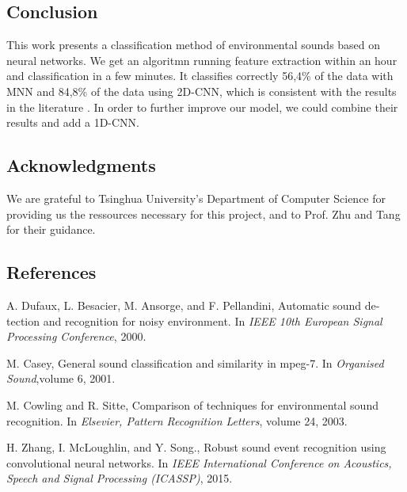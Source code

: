 \documentclass[final]{beamer}
\begin{document}
\begin{frame}[t]
\begin{multicols}{3}
\section{Conclusion}

	This work presents a classification method of environmental sounds based on neural networks. We get an algoritmn running feature extraction within an hour and classification in a few minutes. It classifies correctly 56,4\% of the data with MNN and 84,8\% of the data using 2D-CNN, which is consistent with the results in the literature \cite{ref4} \cite{ref5} \cite{ref6}.
	In order to further improve our model, we could combine their results and add a 1D-CNN.


\subsection{Acknowledgments}
	We are grateful to Tsinghua University's Department of Computer Science for providing us the ressources necessary for this project,
	and to Prof. Zhu and Tang for their guidance.


\subsection{References}

\begin{thebibliography}{99}

 A. Dufaux, L. Besacier, M. Ansorge, and F. Pellandini, Automatic sound de-
tection and recognition for noisy environment. In \textit{IEEE 10th European Signal Processing Conference}, 2000.

 M. Casey, General sound classification and similarity in mpeg-7. In \textit{Organised Sound},volume 6, 2001.

 M. Cowling and R. Sitte, Comparison of techniques for environmental sound recognition. In \textit{Elsevier, Pattern Recognition Letters}, volume 24, 2003.

 H. Zhang, I. McLoughlin, and Y. Song., Robust sound event recognition using convolutional neural networks. In \textit{IEEE International Conference on Acoustics, 
Speech and Signal Processing (ICASSP)}, 2015.


\end{thebibliography}
\end{multicols}
\end{frame}
\end{document}
